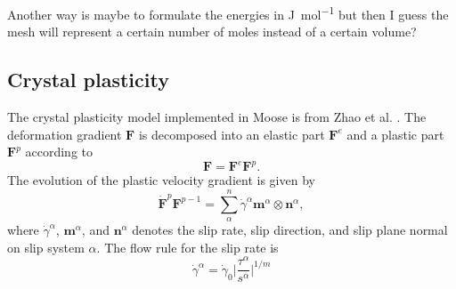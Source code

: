 \documentclass[12pt,a4paper]{article}
\providecommand{\abs}[1]{\lvert#1\rvert}
\providecommand{\vbf}[1]{\boldsymbol{#1}}
\begin{document}
Another way is maybe to formulate the energies in \si{\joule\per\mol} but then I guess the mesh will represent a certain number of moles instead of a certain volume? 

\subsection{Crystal plasticity}\label{sec:crypla}
The crystal plasticity model implemented in Moose is from Zhao et al. \cite{zhao2017plastic}.
The deformation gradient $\vbf{F}$ is decomposed into an elastic part $\vbf{F}^e$ and a plastic part $\vbf{F}^p$ according to
\begin{equation}
\vbf{F}=\vbf{F}^e\vbf{F}^p.
\end{equation}
The evolution of the plastic velocity gradient is given by
\begin{equation}
  \dot{\vbf{F}}^p\vbf{F}^{p-1}=\sum_\alpha^n\dot{\gamma}^\alpha\vbf{m}^\alpha\otimes\vbf{n}^\alpha,
\end{equation}
where $\dot{\gamma}^\alpha$, $\vbf{m}^\alpha$, and $\vbf{n}^\alpha$ denotes the slip rate, slip direction, and slip plane normal on slip system $\alpha$.
The flow rule for the slip rate is 
\begin{equation}
  \dot{\gamma}^\alpha=\dot{\gamma}_0\abs{\frac{\tau^\alpha}{s^\alpha}}^{1/m}
\end{equation}
\end{document}
